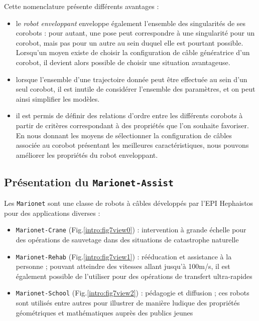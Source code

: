 Cette nomenclature présente différents avantages :
\begin{itemize}
 \item le {\it robot enveloppant} enveloppe également l'ensemble des singularités de ses corobots : pour autant, une pose peut correspondre à une singularité pour un corobot, mais pas pour un autre au sein duquel elle est pourtant possible. Lorsqu'un moyen existe de choisir la configuration de câble génératrice d'un corobot, il devient alors possible de choisir une situation avantageuse.
 \item lorsque l'ensemble d'une trajectoire donnée peut être effectuée au sein d'un seul corobot, il est inutile de considérer l'ensemble des paramètres, et on peut ainsi simplifier les modèles.
 \item il est permis de définir des relations d'ordre entre les différents corobots à partir de critères correspondant à des propriétés que l'on souhaite favoriser. En nous donnant les moyens de sélectionner la configuration de câbles associée au corobot présentant les meilleures caractéristiques, nous pouvons améliorer les propriétés du robot enveloppant.
\end{itemize}


\subsection{Présentation du {\tt Marionet-Assist}}

Les {\tt Marionet} sont une classe de robots à câbles développés par l'EPI Hephaistos pour des applications diverses :
\begin{itemize}
 \item {\tt Marionet-Crane} (Fig.\ref{intro:fig7view0}) : intervention à grande échelle pour des opérations de sauvetage dans des situations de catastrophe naturelle
 \item {\tt Marionet-Rehab} (Fig.\ref{intro:fig7view1}) : rééducation et assistance à la personne ; pouvant atteindre des vitesses allant jusqu'à 100m/s, il est également possible de l'utiliser pour des opérations de transfert ultra-rapides
 \item {\tt Marionet-School} (Fig.\ref{intro:fig7view2}) : pédagogie et diffusion ; ces robots sont utilisés entre autres pour illustrer de manière ludique des propriétés géométriques et mathématiques auprès des publics jeunes
\end{itemize}

